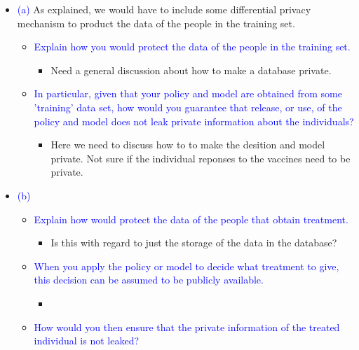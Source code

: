 \begin{itemize}
    \item \textcolor{blue}{(a)}
        As explained, we would have to include some differential privacy mechanism to product the data of the people in the training set. 
        \begin{itemize}
            \item \textcolor{blue}{Explain how you would protect the data of the people in the training set.}
                \begin{itemize}
                    \item Need a general discussion about how to make a database private.  
                \end{itemize}
            \item \textcolor{blue}{In particular, given that your policy and model are obtained from some 'training' data set, how would you guarantee that release, or use, of the policy and model does not leak private information about the individuals?}
                \begin{itemize}
                    \item Here we need to discuss how to to make the desition and model private. 
                    Not sure if the individual reponses to the vaccines need to be private. 
                \end{itemize}
        \end{itemize}
    \item \textcolor{blue}{(b)}
        \begin{itemize}
            \item \textcolor{blue}{Explain how would protect the data of the people that obtain treatment.}
                \begin{itemize}
                    \item Is this with regard to just the storage of the data in the database?
                \end{itemize}
            \item \textcolor{blue}{When you apply the policy or model to decide what treatment to give, this decision can be assumed to be publicly available.}
                \begin{itemize}
                    \item 
                \end{itemize}
            \item \textcolor{blue}{How would you then ensure that the private information of the treated individual is not leaked?}
                \begin{itemize}

\end{itemize}
\end{itemize}
\end{itemize}
